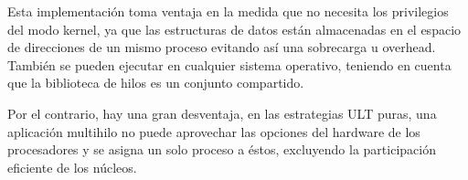 \documentclass[12pt, letter]{article}
\begin{document}
\setlength{\parindent}{31pt}
Esta implementación toma ventaja en la medida que no necesita los privilegios del modo kernel, ya que las estructuras de datos están almacenadas en el espacio de direcciones de un mismo proceso evitando así una sobrecarga u overhead. También se pueden ejecutar en cualquier sistema operativo, teniendo en cuenta que la biblioteca de hilos es un conjunto compartido.

\setlength{\parindent}{31pt}
Por el contrario, hay una gran desventaja, en las estrategias ULT puras, una aplicación multihilo no puede aprovechar las opciones del hardware de los procesadores y se asigna un solo proceso a éstos, excluyendo la participación eficiente de los núcleos.

\nocite{*}
\printbibliography[title={Referencias}]
\end{document}

